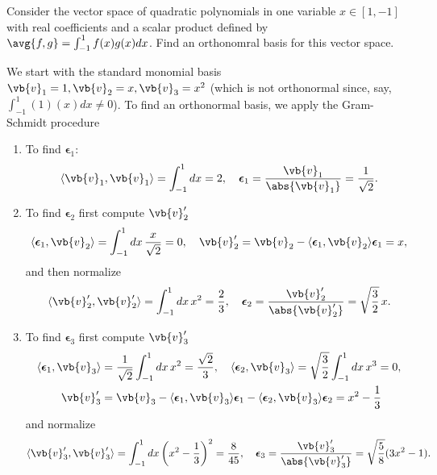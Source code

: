 \documentclass[a4paper,12pt]{report}
\begin{document}
{Consider the vector space of quadratic polynomials in one variable \(x \in [1,-1]\) with real coefficients and a scalar product defined by \(\avg{f,g} = \int_{-1}^{1} f(x)g(x)dx \). Find an orthonomral basis for this vector space.}
{We start with the standard monomial basis \(\vb{v} _1 = 1, \vb{v} _2 = x, \vb{v} _3 =x^2\)  (which is not orthonormal since, say, \(\int_{-1}^{1} (1)(x)dx \neq 0  \)). To find an orthonormal basis, we apply the Gram-Schmidt procedure

\begin{enumerate}
    \item To find \(\boldsymbol{\epsilon}_1\):
    \begin{equation}
    \langle \vb{v}_1, \vb{v}_1 \rangle = \int_{-1}^{1} dx = 2, \quad \boldsymbol{\epsilon}_1 = \frac{\vb{v}_1}{\abs{\vb{v}_1}} = \frac{1}{\sqrt{2}}.
    \end{equation}
    \item To find \(\boldsymbol{\epsilon}_2\) first compute \(\vb{v}'_2\)
    \begin{equation}
    \langle \boldsymbol{\epsilon}_1, \vb{v}_2 \rangle = \int_{-1}^{1} dx \, \frac{x}{\sqrt{2}} = 0, \quad \vb{v}'_2 = \vb{v}_2 - \langle \boldsymbol{\epsilon}_1, \vb{v}_2 \rangle \boldsymbol{\epsilon}_1 = x,
    \end{equation}
    and then normalize
    \begin{equation}
    \langle \vb{v}'_2, \vb{v}'_2 \rangle = \int_{-1}^{1} dx \, x^2 = \frac{2}{3}, \quad \boldsymbol{\epsilon}_2 = \frac{\vb{v}'_2}{\abs{\vb{v}'_2}} = \sqrt{\frac{3}{2}} \, x.
    \end{equation}
    \item To find \(\boldsymbol{\epsilon}_3\) first compute \(\vb{v}'_3\)
    \begin{equation}
    \begin{aligned}
    \langle \boldsymbol{\epsilon}_1, \vb{v}_3 \rangle &= \frac{1}{\sqrt{2}} \int_{-1}^{1} dx \, x^2 = \frac{\sqrt{2}}{3}, \quad \langle \boldsymbol{\epsilon}_2, \vb{v}_3 \rangle = \sqrt{\frac{3}{2}} \int_{-1}^{1} dx \, x^3 = 0, \\ \quad \vb{v}'_3 &= \vb{v}_3 - \langle \boldsymbol{\epsilon}_1, \vb{v}_3 \rangle \boldsymbol{\epsilon}_1 - \langle \boldsymbol{\epsilon}_2, \vb{v}_3 \rangle \boldsymbol{\epsilon}_2 = x^2 - \frac{1}{3}
    \end{aligned}
    \end{equation}
    and normalize
    \begin{equation}
    \langle \vb{v}'_3, \vb{v}'_3 \rangle = \int_{-1}^{1} dx \left( x^2 - \frac{1}{3} \right)^2 = \frac{8}{45}, \quad \boldsymbol{\epsilon}_3 = \frac{\vb{v}'_3}{\abs{\vb{v}'_3}} = \sqrt{\frac{5}{8}} (3x^2 - 1).
    \end{equation}
\end{enumerate}

}
\end{document}
